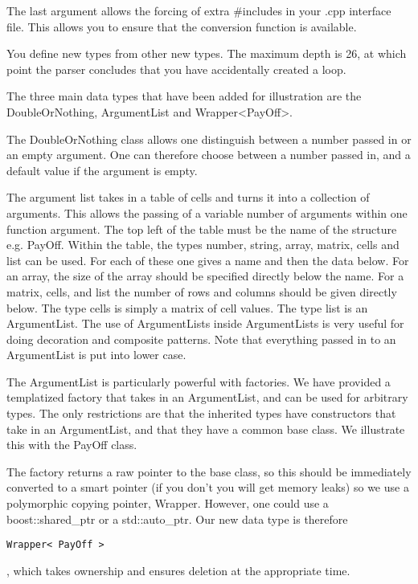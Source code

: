 \documentclass[12pt,reqno]{amsart}
\numberwithin{equation}{section}
\numberwithin{figure}{section}
\begin{document}
The last argument allows the forcing of extra \#includes in your .cpp
interface file. This allows you to ensure that the conversion function
is available. 

You define new types from other new types. The maximum depth is 26, at
which point the parser concludes that you have accidentally created a
loop. 

The three main data types that have been added for illustration are the
DoubleOrNothing, ArgumentList and Wrapper\textless PayOff\textgreater . 

The DoubleOrNothing class allows one distinguish between a number passed in
or an empty argument. One can therefore choose between a number passed
in, and a default value if the argument is empty. 

The argument list takes in a table of cells and turns it into a
collection of arguments. This allows the passing of a variable number of
arguments within one function argument. The top left of the table must be
the name of the structure e.g. PayOff. Within the table, the types
number, string, array, matrix, cells and list can be used. For each of
these one gives a name and then the data below. For an array, the size
of the array should be specified directly below the name. For a
matrix, cells, and list the number of rows and columns should be given
directly below. The type cells is simply a matrix of cell values. The
type list is an ArgumentList. The use of
ArgumentLists inside ArgumentLists is very useful for doing
decoration and composite patterns. Note that everything passed in to an
ArgumentList is put into lower case. 

The ArgumentList is particularly powerful with factories. We have
 provided a templatized factory that takes in an ArgumentList, and can be
 used for arbitrary types. The only restrictions are that the
 inherited types have constructors that take in an ArgumentList, and
 that they have a common base class.  
 We illustrate this with the PayOff class. 

The factory returns a raw pointer to the base class, so this should be
immediately converted to a smart pointer (if you don't you will get
memory leaks) so we use a polymorphic copying pointer,
Wrapper. However, one could use a boost::shared\_ptr or a
std::auto\_ptr. Our new data type is therefore 

\begin{verbatim}
Wrapper< PayOff >
\end{verbatim}

, which takes ownership and ensures deletion at the appropriate time. 
\end{document}
